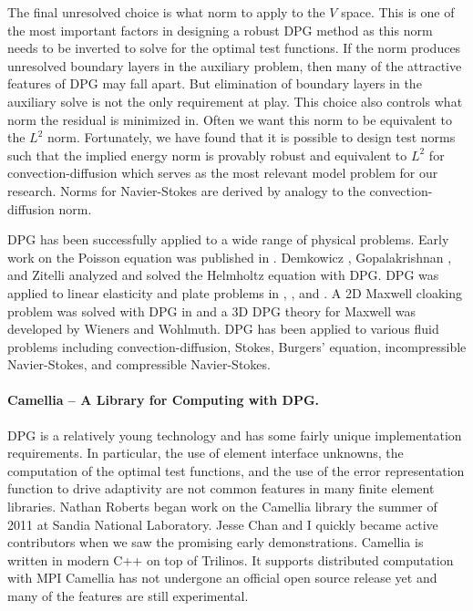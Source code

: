 \documentclass[Dissertation.tex]{subfiles}
\begin{document}
The final unresolved choice is what norm to apply to the $V$ space.
This is one of the most important factors in designing a robust DPG method as this norm needs to be inverted to solve for the optimal test functions.
If the norm produces unresolved boundary layers in the auxiliary problem, then many of the attractive features of DPG may fall apart.
But elimination of boundary layers in the auxiliary solve is not the only requirement at play.
This choice also controls what norm the residual is minimized in.
Often we want this norm to be equivalent to the $L^2$ norm.
Fortunately, we have found that it is possible to design test norms such that the implied energy norm
is provably robust and equivalent to $L^2$ for convection-diffusion which
serves as the most relevant model problem for our research.
Norms for Navier-Stokes are derived by analogy to the convection-diffusion norm.

DPG has been successfully applied to a wide range of physical problems.
Early work on the Poisson equation was published in \cite{DPGPoisson}.
Demkowicz \etal\cite{DPGHelmholtz}, Gopalakrishnan \etal\cite{Gopalakrishnan2014}, and Zitelli \etal\cite{DPG4}
analyzed and solved the Helmholtz equation with DPG.
DPG was applied to linear elasticity and plate problems in \cite{BramwellDPG}, \cite{NiemiBramwellDemkowicz10}, and \cite{BramwellDemkowiczQiu10}.
A 2D Maxwell cloaking problem was solved with DPG in \cite{DPGCloaking}
and a 3D DPG theory for Maxwell was developed by Wieners and Wohlmuth\cite{WohlmuthReport}.
DPG has been applied to various fluid problems including convection-diffusion\cite{DPG3,DemkowiczHeuer,ChanHeuerThanhDemkowicz2012,Chan2013,EllisLC},
Stokes\cite{DPGStokes,EllisLC}, Burgers' equation\cite{Chan2013dpg}, incompressible Navier-Stokes\cite{NateDissertation,RobertsDPGNavierStokes},
and compressible Navier-Stokes\cite{JesseDissertation}.

\paragraph{Camellia -- A Library for Computing with DPG.}
DPG is a relatively young technology and has some fairly unique implementation requirements. 
In particular, the use of element interface unknowns, the computation of the optimal test functions,
and the use of the error representation function to drive adaptivity are not common
features in many finite element libraries.
Nathan Roberts began work on the Camellia\cite{CamelliaDPG} library the summer of 2011 at Sandia National Laboratory.
Jesse Chan and I quickly became active contributors when we saw the promising early demonstrations.
Camellia is written in modern C++ on top of Trilinos\cite{Trilinos}.
It supports distributed computation with MPI
Camellia has not undergone an official open source release yet and many of the features are still experimental.
\end{document}
